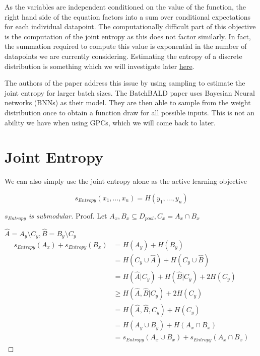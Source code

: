 \documentclass[12pt, a4paper]{report}
\theoremstyle{definition}
\newtheorem{proof}{Proof}[section]
\begin{document}
As the variables are independent conditioned on the value of the function, the right hand side of the equation factors into a sum over conditional expectations for each individual datapoint. The computationally difficult part of this objective is the computation of the joint entropy as this does not factor similarly. In fact, the summation required to compute this value is exponential in the number of datapoints we are currently considering. Estimating the entropy of a discrete distribution is something which we will investigate later \hyperref[sec:Entropy]{here}.


The authors of the paper address this issue by using sampling to estimate the joint entropy for larger batch sizes. The BatchBALD paper uses Bayesian Neural networks (BNNs) as their model. They are then able to sample from the weight distribution once to obtain a function draw for all possible inputs. This is not an ability we have when using GPCs, which we will come back to later.


\section{Joint Entropy}

We can also simply use the joint entropy alone as the active learning objective

$$s_{Entropy} (x_1, \ldots, x_n) = H(y_1, \ldots, y_n)$$

\begin{proof}[$s_{Entropy}$ is submodular]
    Proof.
    Let $A_x,B_x \subseteq D_{pool}, C_x = A_x \cap B_x$
    
    $\hat{A} = A_y \setminus C_y, \hat{B} = B_y \setminus C_y$
    \begin{align*}
        s_{Entropy} (A_x) + s_{Entropy} (B_x) &= H(A_y) + H(B_y)\\
        &= H(C_y \cup \hat{A}) + H(C_y \cup \hat{B})\\
        &= H(\hat{A} | C_y) + H(\hat{B} | C_y) + 2 H(C_y)\\
        &\geq H(\hat{A}, \hat{B} | C_y) + 2 H(C_y)\\
        &= H(\hat{A}, \hat{B}, C_y) + H(C_y)\\
        &= H(A_y \cup B_y) + H(A_x \cap B_x)\\
        &= s_{Entropy} (A_x \cup B_x) + s_{Entropy} (A_x \cap B_x)
    \end{align*}

\end{proof}
\end{document}
